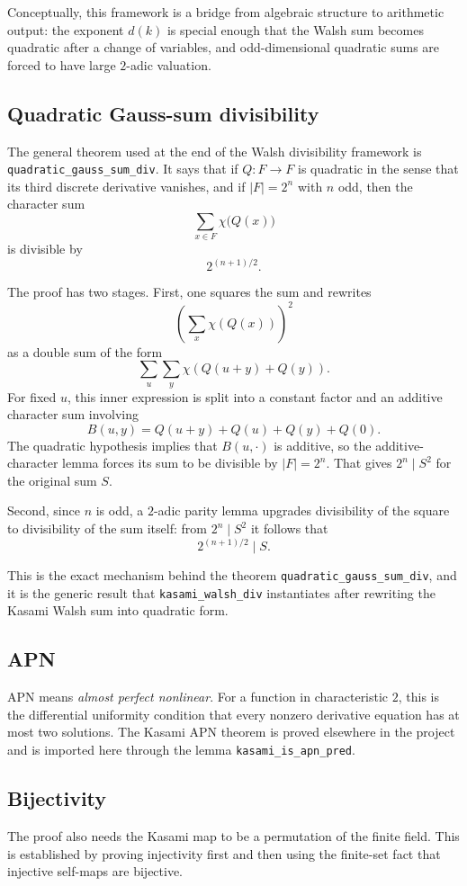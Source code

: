 \documentclass[11pt]{article}
\begin{document}
Conceptually, this framework is a bridge from algebraic structure to arithmetic output: the exponent $d(k)$ is special enough that the Walsh sum becomes quadratic after a change of variables, and odd-dimensional quadratic sums are forced to have large $2$-adic valuation.

\subsection{Quadratic Gauss-sum divisibility}
The general theorem used at the end of the Walsh divisibility framework is \texttt{quadratic\_gauss\_sum\_div}. It says that if $Q : F \to F$ is quadratic in the sense that its third discrete derivative vanishes, and if $|F|=2^n$ with $n$ odd, then the character sum
\[
  \sum_{x \in F} \chi\bigl(Q(x)\bigr)
\]
is divisible by
\[
  2^{(n+1)/2}.
\]

The proof has two stages. First, one squares the sum and rewrites
\[
  \left(\sum_x \chi(Q(x))\right)^2
\]
as a double sum of the form
\[
  \sum_u \sum_y \chi(Q(u+y)+Q(y)).
\]
For fixed $u$, this inner expression is split into a constant factor and an additive character sum involving
\[
  B(u,y)=Q(u+y)+Q(u)+Q(y)+Q(0).
\]
The quadratic hypothesis implies that $B(u,\cdot)$ is additive, so the additive-character lemma forces its sum to be divisible by $|F|=2^n$. That gives $2^n \mid S^2$ for the original sum $S$.

Second, since $n$ is odd, a $2$-adic parity lemma upgrades divisibility of the square to divisibility of the sum itself: from $2^n \mid S^2$ it follows that
\[
  2^{(n+1)/2} \mid S.
\]

This is the exact mechanism behind the theorem \texttt{quadratic\_gauss\_sum\_div}, and it is the generic result that \texttt{kasami\_walsh\_div} instantiates after rewriting the Kasami Walsh sum into quadratic form.

\subsection{APN}
APN means \emph{almost perfect nonlinear}. For a function in characteristic $2$, this is the differential uniformity condition that every nonzero derivative equation has at most two solutions.
The Kasami APN theorem is proved elsewhere in the project and is imported here through the lemma \texttt{kasami\_is\_apn\_pred}.

\subsection{Bijectivity}
The proof also needs the Kasami map to be a permutation of the finite field. This is established by proving injectivity first and then using the finite-set fact that injective self-maps are bijective.
\end{document}

